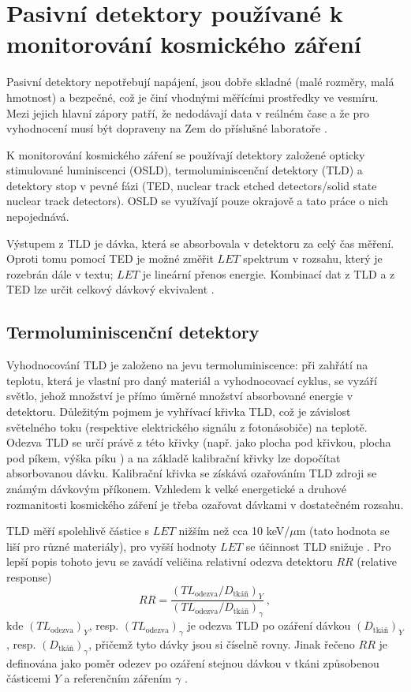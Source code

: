 \chapter{Pasivní detektory používané k monitorování kosmického záření}\label{sec:detektory_detektory}
Pasivní detektory nepotřebují napájení, jsou dobře skladné (malé rozměry, malá hmotnost) a bezpečné, což je činí vhodnými měřícími prostředky ve vesmíru. Mezi jejich hlavní zápory patří, že nedodávají data v reálném čase a že pro vyhodnocení musí být dopraveny na Zem do příslušné laboratoře \cite{benton}.

K monitorování kosmického záření se používají detektory založené opticky stimulované luminiscenci (OSLD), termoluminiscenční detektory (TLD) a detektory stop v pevné fázi (TED, nuclear track etched detectors/solid state nuclear track detectors). OSLD se využívají pouze okrajově a tato práce o nich nepojednává.

Výstupem z TLD je dávka, která se absorbovala v detektoru za celý čas měření. Oproti tomu pomocí TED je možné změřit $\mathit{LET}$ spektrum v rozsahu, který je rozebrán dále v textu; $\mathit{LET}$ je lineární přenos energie. Kombinací dat z TLD a z TED lze určit celkový dávkový ekvivalent \cite{benton}.
\section{Termoluminiscenční detektory}\label{sec:detektory_TLD}
Vyhodnocování TLD je založeno na jevu termoluminiscence: při zahřátí na teplotu, která je vlastní pro daný materiál a vyhodnocovací cyklus, se vyzáří světlo, jehož množství je přímo úměrné množství absorbované energie v detektoru. Důležitým pojmem je vyhřívací křivka TLD, což je závislost světelného toku (respektive elektrického signálu z fotonásobiče) na teplotě. Odezva TLD se určí právě z této křivky (např. jako plocha pod křivkou, plocha pod píkem, výška píku \cite{dosis}) a na základě kalibrační křivky lze dopočítat absorbovanou dávku. Kalibrační křivka se získává ozařováním TLD zdroji se známým dávkovým příkonem. Vzhledem k velké energetické a druhové rozmanitosti kosmického záření je třeba ozařovat dávkami v dostatečném rozsahu. 

TLD měří spolehlivě částice s $\mathit{LET}$ nižším než cca 10 keV/$\mu$m (tato hodnota se liší pro různé materiály), pro vyšší hodnoty $\mathit{LET}$ se účinnost TLD snižuje \cite{passDetectors}. Pro lepší popis tohoto jevu se zavádí veličina relativní odezva detektoru $\mathit{RR}$ (relative response)
\begin{equation}
  \mathit{RR}=\frac{\left(TL_{\text{odezva}}/D_{\text{tkáň}}\right)_Y}{\left(TL_{\text{odezva}}/D_{\text{tkáň}}\right)_{\gamma}}\,,
  \label{eq:detektory_TLD_RR}
\end{equation}
kde $(TL_{\text{odezva}})_Y$, resp. $(TL_{\text{odezva}})_{\gamma}$ je odezva TLD po ozáření dávkou $(D_{\text{tkáň}})_Y$, resp. $(D_{\text{tkáň}})_{\gamma}$, přičemž tyto dávky jsou si číselně rovny. Jinak řečeno $\mathit{RR}$ je definována jako poměr odezev po ozáření stejnou dávkou v tkáni způsobenou částicemi $Y$ a referenčním zářením $\gamma$ \cite{TLD_RR}. 


